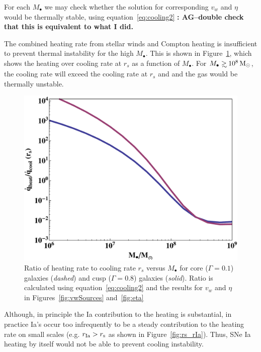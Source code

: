 \documentclass[usenatbib,fleqn]{mn2e}
\newcommand\gsim{\mathrel{\rlap{\lower4pt\hbox{\hskip1pt$\sim$}}
    \raise1pt\hbox{$>$}}}
\newcommand{\rs}{r_s}
\newcommand{\Mbh}[1][]{M_{\bullet#1}}
\newcommand{\vwO}{v_{w}}
\begin{document}
For each $\Mbh$ we may check whether the solution for corresponding
$\vwO$ and $\eta$ would be thermally stable, using
equation~\eqref{eq:cooling2} {\bf: AG--double check that this is
  equivalent to what I did.}

The combined heating rate from stellar winds and Compton heating is
insufficient to prevent thermal instability for the high $\Mbh$.  This
is shown in Figure~\ref{fig:cooling2}, which shows the heating over
cooling rate at $\rs$ as a function of $\Mbh$. For $\Mbh\gsim 10^8
\Msun$, the cooling rate will exceed the cooling rate at $\rs$ and
and the gas would be thermally unstable.

\begin{figure}
\includegraphics[width=\columnwidth]{cooling2.pdf}
\caption{\label{fig:cooling2} Ratio of heating rate to cooling rate
  $\rs$ versus $\Mbh$ for core ($\Gamma=0.1$) galaxies ({\it dashed})
  and cusp ($\Gamma=0.8$) galaxies ({\it solid}). Ratio is calculated
  using equation~\eqref{eq:cooling2} and the results for $\vwO$ and
  $\eta$ in Figures~\ref{fig:vwSources} and~\ref{fig:eta}}
\end{figure}

Although, in principle the Ia contribution to the heating is
substantial, in practice Ia's occur too infrequently to be a steady
contribution to the heating rate on small scales (e.g. $r_{\rm Ia} >
r_{\rm s}$ as shown in Figure~\ref{fig:rs_rIa}). Thus, SNe Ia heating
by itself would not be able to prevent cooling instability.
\end{document}
